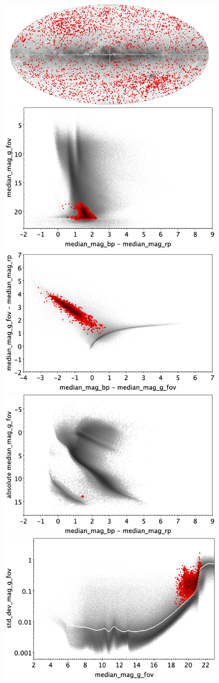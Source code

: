 \documentclass[longauth]{aa}
\begin{document}
\begin{appendix}
\begin{figure}
\centering
{} \includegraphics[width=0.6\hsize]{figures/appendix/GALAXY_trn_sky.png} \\ %
\vspace{4mm}
 \includegraphics[width=0.45\hsize]{figures/appendix/GALAXY_trn_cm.png}  %
\hspace{2mm}
 \includegraphics[width=0.45\hsize]{figures/appendix/GALAXY_trn_cc.png} \\ %
\vspace{4mm}
 \includegraphics[width=0.45\hsize]{figures/appendix/GALAXY_trn_cam.png}  %
\hspace{2mm}
 \includegraphics[width=0.45\hsize]{figures/appendix/GALAXY_trn_msd.png} \\ %

\end{figure}
\end{appendix}
\end{document}
